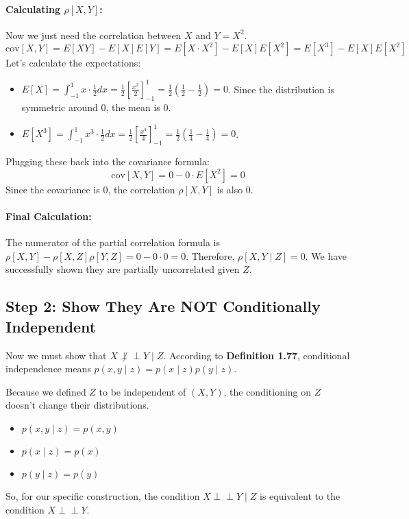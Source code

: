 \documentclass[11pt,a4paper]{article}
\begin{document}
\paragraph{Calculating $\rho[X, Y]$:}
Now we just need the correlation between $X$ and $Y=X^2$.
\[
\text{cov}[X, Y] = E[XY] - E[X]E[Y] = E[X \cdot X^2] - E[X]E[X^2] = E[X^3] - E[X]E[X^2]
\]
Let's calculate the expectations:
\begin{itemize}
    \item $E[X] = \int_{-1}^{1} x \cdot \frac{1}{2} dx = \frac{1}{2} \left[ \frac{x^2}{2} \right]_{-1}^{1} = \frac{1}{2} (\frac{1}{2} - \frac{1}{2}) = 0$. Since the distribution is symmetric around 0, the mean is 0.
    \item $E[X^3] = \int_{-1}^{1} x^3 \cdot \frac{1}{2} dx = \frac{1}{2} \left[ \frac{x^4}{4} \right]_{-1}^{1} = \frac{1}{2} (\frac{1}{4} - \frac{1}{4}) = 0$.
\end{itemize}
Plugging these back into the covariance formula:
\[
\text{cov}[X, Y] = 0 - 0 \cdot E[X^2] = 0
\]
Since the covariance is 0, the correlation $\rho[X, Y]$ is also 0.

\paragraph{Final Calculation:}
The numerator of the partial correlation formula is $\rho[X, Y] - \rho[X, Z]\rho[Y, Z] = 0 - 0 \cdot 0 = 0$.
Therefore, $\rho[X, Y \mid Z] = 0$. We have successfully shown they are partially uncorrelated given $Z$.

\subsection{Step 2: Show They Are NOT Conditionally Independent}
Now we must show that $X \not\perp\perp Y \mid Z$.
According to \textbf{Definition 1.77}, conditional independence means $p(x, y \mid z) = p(x \mid z) p(y \mid z)$.

Because we defined $Z$ to be independent of $(X, Y)$, the conditioning on $Z$ doesn't change their distributions.
\begin{itemize}
    \item $p(x, y \mid z) = p(x, y)$
    \item $p(x \mid z) = p(x)$
    \item $p(y \mid z) = p(y)$
\end{itemize}
So, for our specific construction, the condition $X \perp\perp Y \mid Z$ is equivalent to the condition $X \perp\perp Y$.
\end{document}
